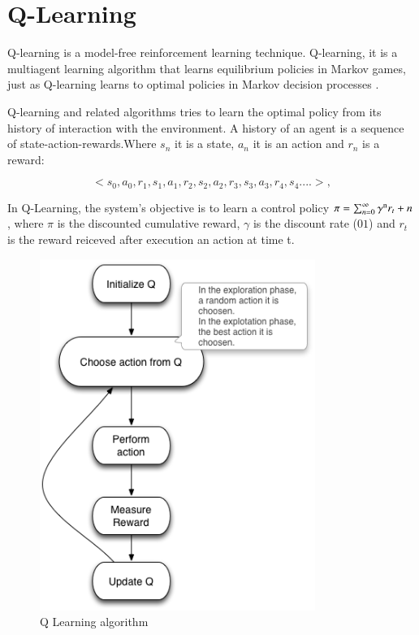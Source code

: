 \section{Q-Learning}

Q-learning is a model-free reinforcement learning technique. Q-learning, it is a multiagent learning algorithm that learns equilibrium policies in Markov games, just as Q-learning learns to optimal policies in Markov decision processes \cite{Greenwald2003}. 

Q-learning and related algorithms tries to learn the optimal policy from its history of interaction with the environment. A history of an agent is a sequence of state-action-rewards.Where $s_{n}$ it is a state, $a_{n}$ it is an action and $r_{n}$ is a reward:

\begin{equation}
<s_{0},a_{0},r_{1},s_{1},a_{1},r_{2},s_{2},a_{2},r_{3},s_{3},a_{3},r_{4},s_{4}....>,
\end{equation}


In Q-Learning, the system's objective is to learn a control policy $\pi = \sum_{n=0}^{\infty} \gamma\textsuperscript{n}  r_{t}+n $, where $\pi$  is the discounted cumulative reward, $\gamma$ is the discount rate ($01$) and $r_{t}$ is the reward reiceved after execution an action at time t.


\begin{figure}[h!]
\centering
\includegraphics[width=0.8\textwidth]{./images/qalgo.png}
\caption{Q Learning algorithm}
\label{fig:qalgo}
\end{figure}


